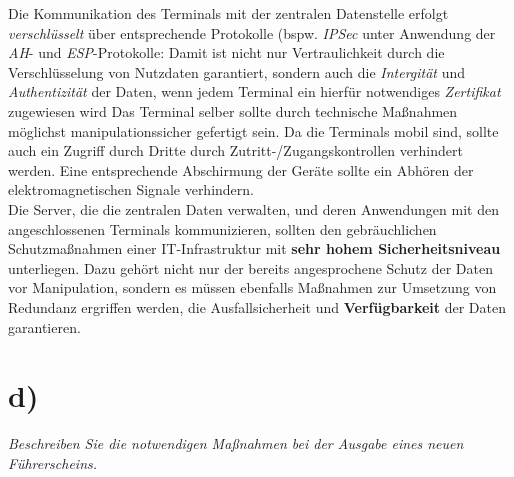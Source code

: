 \noindent
 Die Kommunikation des Terminals mit der zentralen Datenstelle erfolgt \textit{verschlüsselt} über entsprechende Protokolle (bspw. \textit{IPSec} unter Anwendung der \textit{AH}- und \textit{ESP}-Protokolle: Damit ist nicht nur Vertraulichkeit durch die Verschlüsselung von Nutzdaten garantiert, sondern auch die \textit{Intergität} und \textit{Authentizität} der Daten, wenn jedem Terminal ein hierfür notwendiges \textit{Zertifikat} zugewiesen wird
Das Terminal selber sollte durch technische Maßnahmen möglichst manipulationssicher gefertigt sein.
Da die Terminals mobil sind, sollte auch ein Zugriff durch Dritte durch Zutritt-/Zugangskontrollen verhindert werden.
Eine entsprechende Abschirmung der Geräte sollte ein Abhören der elektromagnetischen Signale verhindern.\\

\noindent
Die Server, die die zentralen Daten verwalten, und deren Anwendungen mit den angeschlossenen Terminals kommunizieren, sollten den gebräuchlichen Schutzmaßnahmen einer IT-Infrastruktur mit \textbf{sehr hohem Sicherheitsniveau} unterliegen.
Dazu gehört nicht nur der bereits angesprochene Schutz der Daten vor Manipulation, sondern es müssen ebenfalls Maßnahmen zur Umsetzung von Redundanz ergriffen werden, die Ausfallsicherheit und \textbf{Verfügbarkeit} der Daten garantieren.

\section{d)}

\textit{Beschreiben Sie die notwendigen Maßnahmen bei der Ausgabe eines neuen Führerscheins.}

